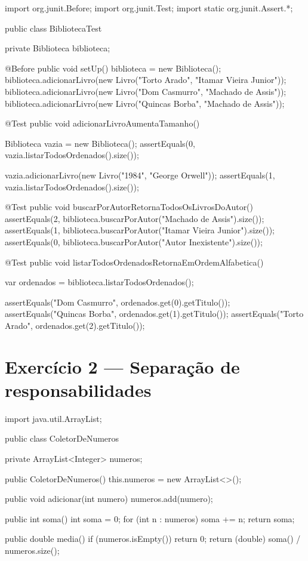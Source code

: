 \documentclass[11pt,a4paper]{article}
\begin{document}
\begin{javacode}
import org.junit.Before;
import org.junit.Test;
import static org.junit.Assert.*;

public class BibliotecaTest {

    private Biblioteca biblioteca;

    @Before
    public void setUp() {
        biblioteca = new Biblioteca();
        biblioteca.adicionarLivro(new Livro("Torto Arado", "Itamar Vieira Junior"));
        biblioteca.adicionarLivro(new Livro("Dom Casmurro", "Machado de Assis"));
        biblioteca.adicionarLivro(new Livro("Quincas Borba", "Machado de Assis"));
    }

    @Test
    public void adicionarLivroAumentaTamanho() {
        Biblioteca vazia = new Biblioteca();
        assertEquals(0, vazia.listarTodosOrdenados().size());

        vazia.adicionarLivro(new Livro("1984", "George Orwell"));
        assertEquals(1, vazia.listarTodosOrdenados().size());
    }

    @Test
    public void buscarPorAutorRetornaTodosOsLivrosDoAutor() {
        assertEquals(2, biblioteca.buscarPorAutor("Machado de Assis").size());
        assertEquals(1, biblioteca.buscarPorAutor("Itamar Vieira Junior").size());
        assertEquals(0, biblioteca.buscarPorAutor("Autor Inexistente").size());
    }

    @Test
    public void listarTodosOrdenadosRetornaEmOrdemAlfabetica() {
        var ordenados = biblioteca.listarTodosOrdenados();

        assertEquals("Dom Casmurro", ordenados.get(0).getTitulo());
        assertEquals("Quincas Borba", ordenados.get(1).getTitulo());
        assertEquals("Torto Arado", ordenados.get(2).getTitulo());
    }
}
\end{javacode}

\section{Exercício 2 --- Separação de responsabilidades}

\begin{javacode}
import java.util.ArrayList;

public class ColetorDeNumeros {
    private ArrayList<Integer> numeros;

    public ColetorDeNumeros() {
        this.numeros = new ArrayList<>();
    }

    public void adicionar(int numero) {
        numeros.add(numero);
    }

    public int soma() {
        int soma = 0;
        for (int n : numeros) {
            soma += n;
        }
        return soma;
    }

    public double media() {
        if (numeros.isEmpty()) {
            return 0;
        }
        return (double) soma() / numeros.size();
    }
}
\end{javacode}
\end{document}
